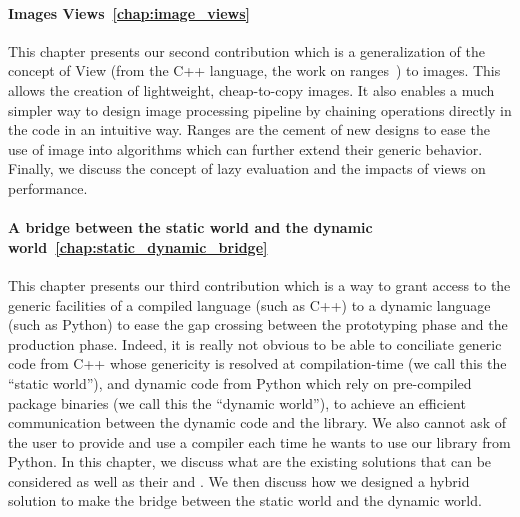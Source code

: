 \paragraph{Images Views~\ref{chap:image_views}} This chapter presents our second contribution which is a generalization
of the concept of View (from the C++ language, the work on ranges~\parencite{niebler.2018.ranges}) to images. This
allows the creation of lightweight, cheap-to-copy images. It also enables a much simpler way to design image processing
pipeline by chaining operations directly in the code in an intuitive way. Ranges are the cement of new designs to ease
the use of image into algorithms which can further extend their generic behavior. Finally, we discuss the concept of
lazy evaluation and the impacts of views on performance.

\paragraph{A bridge between the static world and the dynamic world~\ref{chap:static_dynamic_bridge}} This chapter
presents our third contribution which is a way to grant access to the generic facilities of a compiled language (such as
C++) to a dynamic language (such as Python) to ease the gap crossing between the prototyping phase and the production
phase. Indeed, it is really not obvious to be able to conciliate generic code from C++ whose genericity is resolved at
compilation-time (we call this the ``static world''), and dynamic code from Python which rely on pre-compiled package
binaries (we call this the ``dynamic world''), to achieve an efficient communication between the dynamic code and the
library. We also cannot ask of the user to provide and use a compiler each time he wants to use our library from Python.
In this chapter, we discuss what are the existing solutions that can be considered as well as their \pros and \cons. We
then discuss how we designed a hybrid solution to make the bridge between the static world and the dynamic world.
